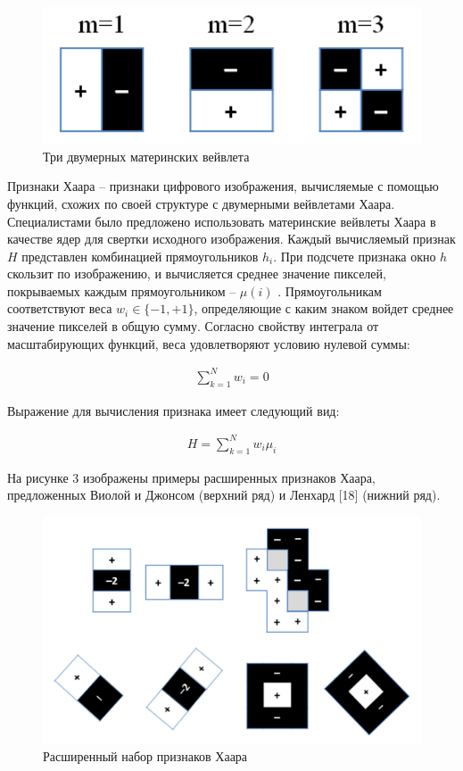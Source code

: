 \documentclass[a4paper, 14pt]{extarticle}	%
\begin{document}
\begin{figure}[h!]
\centering
\includegraphics[scale=0.6]{res/pic002}
\caption{Три двумерных материнских вейвлета}
\end{figure}

Признаки Хаара -- признаки цифрового изображения, вычисляемые с помощью функций, схожих по своей структуре с двумерными вейвлетами Хаара. Специалистами было предложено использовать материнские вейвлеты Хаара в качестве ядер для свертки исходного изображения. Каждый вычисляемый признак $H$ представлен комбинацией прямоугольников $h_i$. При подсчете признака окно $h$ скользит по изображению, и вычисляется среднее значение пикселей, покрываемых каждым прямоугольником -- $\mu(i)$ . Прямоугольникам соответствуют веса $w_i \in \{−1, +1\}$, определяющие с каким знаком войдет среднее значение пикселей в общую сумму. Согласно свойству интеграла от масштабирующих функций, веса удовлетворяют условию нулевой суммы:

\begin{gather}
\sum\limits_{k=1}^N w_i=0
\end{gather}

Выражение для вычисления признака имеет следующий вид:

\begin{gather}
H = \sum\limits_{k=1}^N w_i \mu_i
\end{gather}

На рисунке 3 изображены примеры расширенных признаков Хаара, предложенных Виолой и Джонсом (верхний ряд) и Ленхард [18] (нижний ряд).

\begin{figure}[h!]
\centering
\includegraphics[scale=0.45]{res/pic003}
\caption{Расширенный набор признаков Хаара}
\end{figure}
\end{document}

